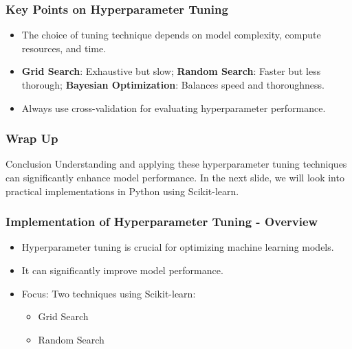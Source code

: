 \documentclass[aspectratio=169]{beamer}
\begin{document}
\begin{frame}[fragile]
    \frametitle{Key Points on Hyperparameter Tuning}
    \begin{itemize}
        \item The choice of tuning technique depends on model complexity, compute resources, and time.
        \item \textbf{Grid Search}: Exhaustive but slow; 
        \textbf{Random Search}: Faster but less thorough; 
        \textbf{Bayesian Optimization}: Balances speed and thoroughness.
        \item Always use cross-validation for evaluating hyperparameter performance.
    \end{itemize}
\end{frame}

\begin{frame}[fragile]
    \frametitle{Wrap Up}
    \begin{block}{Conclusion}
        Understanding and applying these hyperparameter tuning techniques can significantly enhance model performance. 
        In the next slide, we will look into practical implementations in Python using Scikit-learn.
    \end{block}
\end{frame}

\begin{frame}[fragile]
    \frametitle{Implementation of Hyperparameter Tuning - Overview}
    \begin{itemize}
        \item Hyperparameter tuning is crucial for optimizing machine learning models.
        \item It can significantly improve model performance.
        \item Focus: Two techniques using Scikit-learn:
        \begin{itemize}
            \item Grid Search
            \item Random Search
        \end{itemize}
    \end{itemize}
\end{frame}
\end{document}
